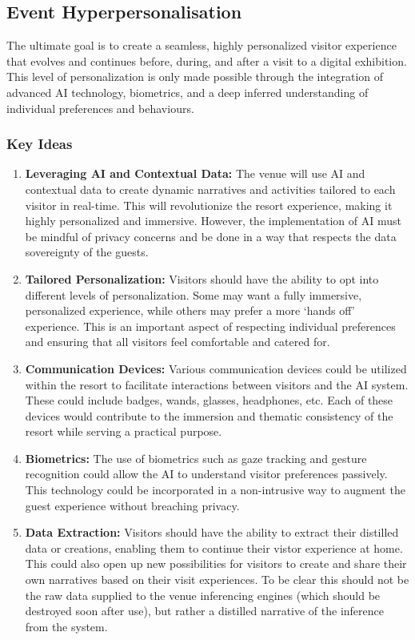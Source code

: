 \subsection{Event Hyperpersonalisation}

The ultimate goal is to create a seamless, highly personalized visitor experience that evolves and continues before, during, and after a visit to a digital exhibition. This level of personalization is only made possible through the integration of advanced AI technology, biometrics, and a deep inferred understanding of individual preferences and behaviours. 

\subsubsection{Key Ideas}
\begin{enumerate}
\item \textbf{Leveraging AI and Contextual Data:} The venue will use AI and contextual data to create dynamic narratives and activities tailored to each visitor in real-time. This will revolutionize the resort experience, making it highly personalized and immersive. However, the implementation of AI must be mindful of privacy concerns and be done in a way that respects the data sovereignty of the guests.
\item \textbf{Tailored Personalization:} Visitors should have the ability to opt into different levels of personalization. Some may want a fully immersive, personalized experience, while others may prefer a more `hands off' experience. This is an important aspect of respecting individual preferences and ensuring that all visitors feel comfortable and catered for.
\item \textbf{Communication Devices:} Various communication devices could be utilized within the resort to facilitate interactions between visitors and the AI system. These could include badges, wands, glasses, headphones, etc. Each of these devices would contribute to the immersion and thematic consistency of the resort while serving a practical purpose.
\item \textbf{Biometrics:} The use of biometrics such as gaze tracking and gesture recognition could allow the AI to understand visitor preferences passively. This technology could be incorporated in a non-intrusive way to augment the guest experience without breaching privacy.
\item \textbf{Data Extraction:} Visitors should have the ability to extract their distilled data or creations, enabling them to continue their vistor experience at home. This could also open up new possibilities for visitors to create and share their own narratives based on their visit experiences. To be clear this should not be the raw data supplied to the venue inferencing engines (which should be destroyed soon after use), but rather a distilled narrative of the inference from the system.

\end{enumerate}
